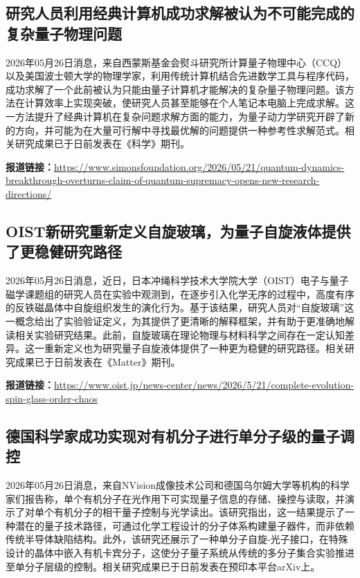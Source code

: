\documentclass[12pt,a4paper]{ctexart}
\begin{document}
\subsection{ 研究人员利用经典计算机成功求解被认为不可能完成的复杂量子物理问题 }

2026年05月26日消息，来自西蒙斯基金会熨斗研究所计算量子物理中心（CCQ）以及美国波士顿大学的物理学家，利用传统计算机结合先进数学工具与程序代码，成功求解了一个此前被认为只能由量子计算机才能解决的复杂量子物理问题。该方法在计算效率上实现突破，使研究人员甚至能够在个人笔记本电脑上完成求解。这一方法提升了经典计算机在复杂问题求解方面的能力，为量子动力学研究开辟了新的方向，并可能为在大量可行解中寻找最优解的问题提供一种参考性求解范式。相关研究成果已于日前发表在《科学》期刊。

\noindent\textbf{报道链接：}\url{https://www.simonsfoundation.org/2026/05/21/quantum-dynamics-breakthrough-overturns-claim-of-quantum-supremacy-opens-new-research-directions/ }

\subsection{ OIST新研究重新定义自旋玻璃，为量子自旋液体提供了更稳健研究路径 }

2026年05月26日消息，近日，日本冲绳科学技术大学院大学（OIST）电子与量子磁学课题组的研究人员在实验中观测到，在逐步引入化学无序的过程中，高度有序的反铁磁晶体中自旋组织发生的演化行为。基于该结果，研究人员对“自旋玻璃”这一概念给出了实验验证定义，为其提供了更清晰的解释框架，并有助于更准确地解读相关实验研究结果。此前，自旋玻璃在理论物理与材料科学之间存在一定认知差异。这一重新定义也为研究量子自旋液体提供了一种更为稳健的研究路径。相关研究成果已于日前发表在《Matter》期刊。

\noindent\textbf{报道链接：}\url{https://www.oist.jp/news-center/news/2026/5/21/complete-evolution-spin-glass-order-chaos }

\subsection{ 德国科学家成功实现对有机分子进行单分子级的量子调控 }

2026年05月26日消息，来自NVision成像技术公司和德国乌尔姆大学等机构的科学家们报告称，单个有机分子在光作用下可实现量子信息的存储、操控与读取，并演示了对单个有机分子的相干量子控制与光学读出。该研究指出，这一结果提示了一种潜在的量子技术路径，可通过化学工程设计的分子体系构建量子器件，而非依赖传统半导体缺陷结构。此外，该研究还展示了一种单分子自旋-光子接口，在特殊设计的晶体中嵌入有机卡宾分子，这使分子量子系统从传统的多分子集合实验推进至单分子层级的控制。相关研究成果已于日前发表在预印本平台arXiv上。
\end{document}
